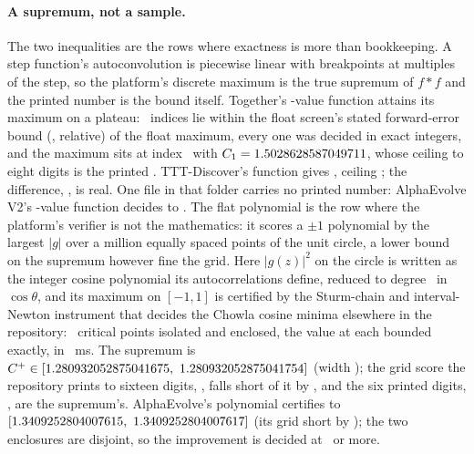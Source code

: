 \documentclass[11pt]{article}
\begin{document}
\paragraph{A supremum, not a sample.} The two inequalities are the rows where exactness is more than
bookkeeping. A step function's autoconvolution is piecewise linear with breakpoints at multiples of the step,
so the platform's discrete maximum is the true supremum of $f*f$ and the printed number is the bound itself.
Together's \AcN-value function attains its maximum on a plateau: \AcCandidates\ indices lie within the float
screen's stated forward-error bound (\AcScreen, relative) of the float maximum, every one was decided in
exact integers, and the maximum sits at index \AcArgmax\ with $C_1=1.5028628587049711$, whose ceiling to eight digits
is the printed \AcPrinted. TTT-Discover's function gives \AcTExact, ceiling \AcTPrinted; the difference,
\AcImprovement, is real. One file in that folder carries no printed number: AlphaEvolve V2's \AcVN-value
function decides to \AcVExact. The flat polynomial is the row where the platform's verifier is not the
mathematics: it scores a $\pm1$ polynomial by the largest $|g|$ over a million equally spaced points of the
unit circle, a lower bound on the supremum however fine the grid. Here $|g(z)|^2$ on the circle is written as
the integer cosine polynomial its autocorrelations define, reduced to degree \FlDegree\ in $\cos\theta$, and
its maximum on $[-1,1]$ is certified by the Sturm-chain and interval-Newton instrument that decides the
Chowla cosine minima elsewhere in the repository: \FlCrit\ critical points isolated and enclosed, the value at
each bounded exactly, in \FlMs\ ms. The supremum is $C^+\in[1.280932052875041675,\ 1.280932052875041754]$ (width \FlWidth); the grid score
the repository prints to sixteen digits, \FlGrid, falls short of it by \FlShortfall, and the six printed
digits, \FlPrinted, are the supremum's. AlphaEvolve's polynomial certifies to $[1.3409252804007615,\ 1.3409252804007617]$ (its grid
short by \FlAEShortfall); the two enclosures are disjoint, so the improvement is decided at \FlImprovement\
or more.
\end{document}
